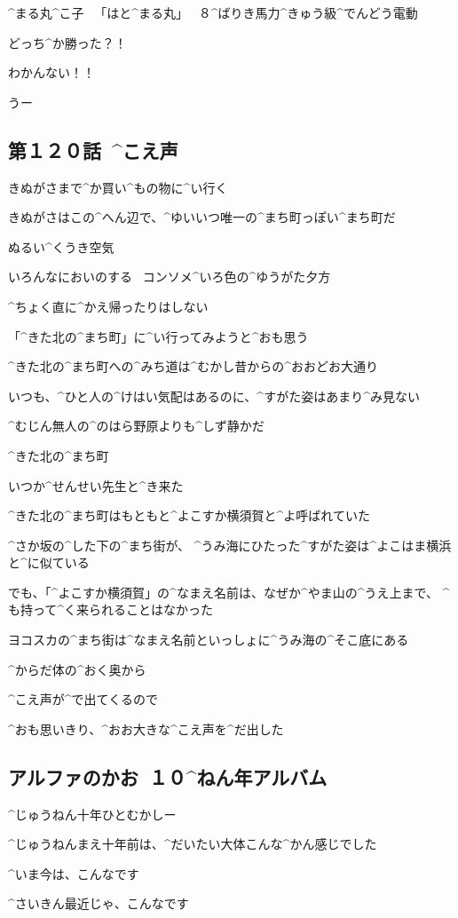 \Sign ^{まる}{丸}^{こ}{子}
\ 「はと^{まる}{丸}」
\ ８^{ばりき}{馬力}^{きゅう}{級}^{でんどう}{電動}

\page[136]
\Maruko どっち^{か}{勝}った？！

\Alpha わかんない！！

\Kokone うー


\subsection{第１２０話\ ^{こえ}{声}}

\page[138]
\Alpha きぬがさまで^{か}{買}い^{もの}{物}に^{い}{行}く

\Alpha きぬがさはこの^{へん}{辺}で、^{ゆいいつ}{唯一}の^{まち}{町}っぽい^{まち}{町}だ

\page[140]
\Alpha ぬるい^{くうき}{空気}

\Alpha いろんなにおいのする
\ コンソメ^{いろ}{色}の^{ゆうがた}{夕方}

\Alpha ^{ちょく}{直}に^{かえ}{帰}ったりはしない

\Alpha 「^{きた}{北}の^{まち}{町}」に^{い}{行}ってみようと^{おも}{思}う

\page[141]
\Alpha ^{きた}{北}の^{まち}{町}への^{みち}{道}は^{むかし}{昔}からの^{おおどお}{大通}り

\Alpha いつも、^{ひと}{人}の^{けはい}{気配}はあるのに、^{すがた}{姿}はあまり^{み}{見}ない

\Alpha ^{むじん}{無人}の^{のはら}{野原}よりも^{しず}{静}かだ

\page[143]
\Alpha ^{きた}{北}の^{まち}{町}

\Alpha いつか^{せんせい}{先生}と^{き}{来}た

\page[144]
\Alpha ^{きた}{北}の^{まち}{町}はもともと^{よこすか}{横須賀}と^{よ}{呼}ばれていた

\Alpha ^{さか}{坂}の^{した}{下}の^{まち}{街}が、
^{うみ}{海}にひたった^{すがた}{姿}は^{よこはま}{横浜}と^{に}{似}ている

\Alpha でも、「^{よこすか}{横須賀}」の^{なまえ}{名前}は、なぜか^{やま}{山}の^{うえ}{上}まで、
^{も}{持}って^{く}{来}られることはなかった

\page[145]
\Alpha ヨコスカの^{まち}{街}は^{なまえ}{名前}といっしょに^{うみ}{海}の^{そこ}{底}にある

\page[147]
\Alpha ^{からだ}{体}の^{おく}{奥}から

\page[148]
\Alpha ^{こえ}{声}が^{で}{出}てくるので

\Alpha ^{おも}{思}いきり、^{おお}{大}きな^{こえ}{声}を^{だ}{出}した



\subsection{アルファのかお\ １０^{ねん}{年}アルバム}

\Alpha ^{じゅうねん}{十年}ひとむかしー

\Alpha ^{じゅうねんまえ}{十年前}は、^{だいたい}{大体}こんな^{かん}{感}じでした

\Alpha ^{いま}{今}は、こんなです

\Alpha ^{さいきん}{最近}じゃ、こんなです
